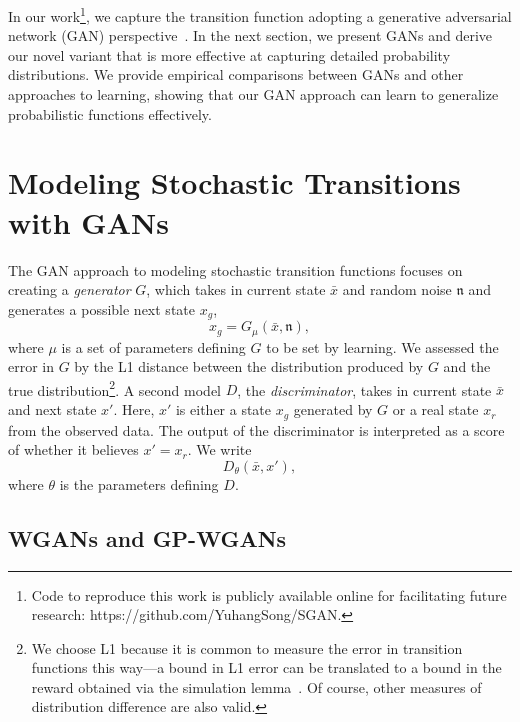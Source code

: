 \documentclass[letterpaper]{article} %
\begin{document}
In our work\footnote{Code to reproduce this work is publicly available online for facilitating future research: https://github.com/YuhangSong/SGAN.}, we capture the transition function adopting a generative adversarial network (GAN) perspective~\cite{goodfellow2014generative}. In the next section, we present GANs and derive our novel variant that is more effective at capturing detailed probability distributions. We provide empirical comparisons between GANs and other approaches to learning, showing that our GAN approach can learn to generalize probabilistic functions effectively.


\section{Modeling Stochastic Transitions with GANs}

The GAN approach to modeling stochastic transition functions focuses on creating a \textit{generator} $G$, which takes in current state $\bar{x}$ and random noise $\mathfrak{n}$ and generates a possible next state $x_g$,
\begin{equation}\label{g-model}
    x_g = G_{\mu}(\bar{x},\mathfrak{n}),
\end{equation}
where $\mu$ is a set of parameters defining $G$ to be set by learning. We assessed the error in $G$ by the L1 distance between the distribution produced by $G$ and the true distribution\footnote{We choose L1 because it is common to measure the error in transition functions this way---a bound in L1 error can be translated to a bound in the reward obtained via the simulation lemma~\cite{kearns02}. Of course, other measures of distribution difference are also valid.}.
A second model $D$, the \textit{discriminator}, takes in current state $\bar{x}$ and next state $x'$. Here, $x'$ is either a state $x_g$ generated by $G$ or a real state $x_r$ from the observed data. The output of the discriminator is interpreted as a score of whether it believes $x' = x_r$. We write
\begin{equation}\label{d-model}
    D_{\theta}(\bar{x},x'),
\end{equation}
where $\theta$ is the parameters defining $D$.

\subsection{WGANs and GP-WGANs}
\end{document}
